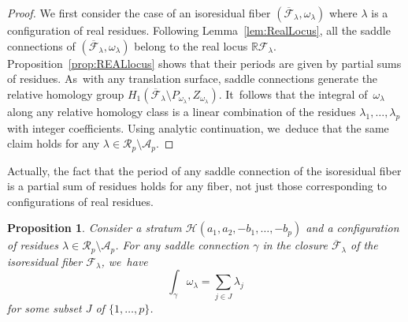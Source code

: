 \documentclass[JEP,XML,SOM,Unicode,NoFloatCountersInSection,published]{cedram}
\newtheorem{prop}[thm]{Proposition}
\theoremstyle{definition}
\begin{document}
\begin{proof}
We first consider the case of an isoresidual fiber $(\overline{\mathcal{F}}_{\lambda},\omega_{\lambda})$ where $\lambda$ is a configuration of real residues. Following Lemma~\ref{lem:RealLocus}, all the saddle connections of $(\overline{\mathcal{F}}_{\lambda},\omega_{\lambda})$ belong to the real locus $\mathbb{R}\mathcal{F}_{\lambda}$. Proposition~\ref{prop:REALlocus} shows that their periods are given by partial sums of residues. As~with any translation surface, saddle connections generate the relative homology group $H_{1}(\overline{\mathcal{F}}_{\lambda} \setminus P_{\omega_{\lambda}},Z_{\omega_{\lambda}})$. It~follows that the integral of~$\omega_{\lambda}$ along any relative homology class is a linear combination of the residues $\lambda_{1},\dots,\lambda_{p}$ with integer coefficients. Using analytic continuation, we~deduce that the same claim holds for any $\lambda \in \mathcal{R}_{p} \setminus \mathcal{A}_{p}$.
\end{proof}

Actually, the fact that the period of any saddle connection of the isoresidual fiber is a partial sum of residues holds for any fiber, not just those corresponding to configurations of real residues.

\begin{prop}\label{prop:SCperiod}
Consider a stratum $\mathcal{H}(a_{1},a_{2},-b_{1},\dots,-b_{p})$ and a configuration of residues
$\lambda \in \mathcal{R}_{p} \setminus \mathcal{A}_{p}$. For any saddle connection $\gamma$ in the closure $\overline{\mathcal{F}}_{\lambda}$ of the isoresidual fiber $\mathcal{F}_{\lambda}$, we~have\vspace*{-3pt}\enlargethispage{.5\baselineskip}
\[
\int_{\gamma} \omega_{\lambda} = \sum_{j \in J} \lambda_{j}
\]
for some subset $J$ of $\lbrace{ 1,\dots,p \rbrace}$.
\end{prop}
\end{document}
